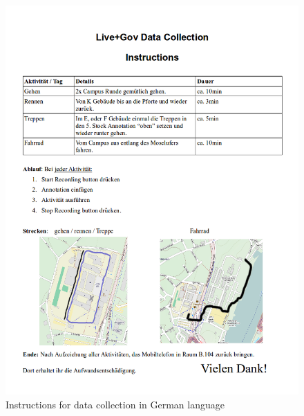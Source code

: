 \begin{figure}[htbp]
  \centering
  \includegraphics[width=\textwidth]{img/har/data_collection_handout.png}
  \caption{Instructions for data collection in German
    language}\label{fig:data_collection_handout}
\end{figure}


%
%


